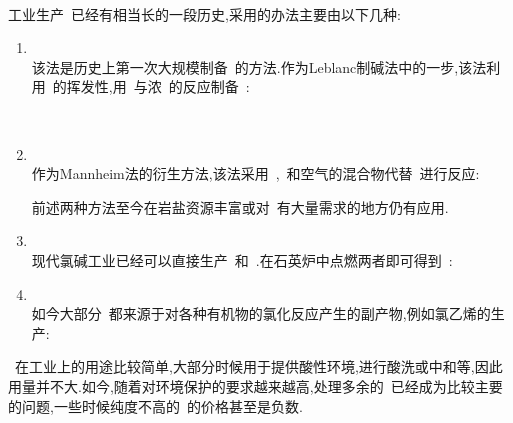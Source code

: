 \documentclass{ctexbook}
\begin{document}
\paragraph{}
工业生产~已经有相当长的一段历史,采用的办法主要由以下几种:
\begin{enumerate}[label=\tbf{\roman*.},leftmargin=*]
    \item {}\\
    \indent 该法是历史上第一次大规模制备~的方法.作为Leblanc制碱法中的一步\cite{Plessen2000},该法利用~的挥发性,用~与浓~的反应制备~:
    \begin{tightcenter}
        \\
    \end{tightcenter}
    \item {}\\
    \indent 作为Mannheim法的衍生方法,该法采用~,~和空气的混合物代替~进行反应:
    \begin{tightcenter}
    \end{tightcenter}
    前述两种方法至今在岩盐资源丰富或对~有大量需求的地方仍有应用.
    \item {}\\
    \indent 现代氯碱工业已经可以直接生产~和~.在石英炉中点燃两者即可得到~:
    \begin{tightcenter}
    \end{tightcenter}
    \item {}\\
    \indent 如今大部分~都来源于对各种有机物的氯化反应产生的副产物,例如氯乙烯的生产:
    \begin{tightcenter}
    \end{tightcenter}
\end{enumerate}
\indent ~在工业上的用途比较简单,大部分时候用于提供酸性环境,进行酸洗或中和等,因此用量并不大.如今,随着对环境保护的要求越来越高,处理多余的~已经成为比较主要的问题,一些时候纯度不高的~的价格甚至是负数.
\end{document}
